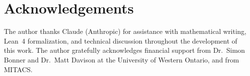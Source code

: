 \section*{Acknowledgements}

The author thanks Claude (Anthropic) for assistance with mathematical writing,
Lean~4 formalization, and technical discussion throughout the development of this
work.  The author gratefully acknowledges financial support from Dr.\ Simon Bonner
and Dr.\ Matt Davison at the University of Western Ontario, and from MITACS.

